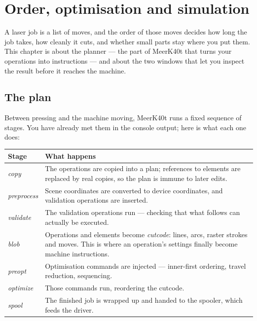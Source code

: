 \chapter{Order, optimisation and simulation}
\label{ch:order}

A laser job is a list of moves, and the order of those moves decides how long the
job takes, how cleanly it cuts, and whether small parts stay where you put them.
This chapter is about the planner --- the part of MeerK40t that turns your
operations into instructions --- and about the two windows that let you inspect
the result before it reaches the machine.

\section{The plan}

Between pressing  and the machine moving, MeerK40t runs a fixed
sequence of stages. You have already met them in the console output; here is what
each one does:

\begin{center}\small
\begin{tabular}{@{}L{2.3cm}L{11.9cm}@{}}
\toprule
\textbf{Stage} & \textbf{What happens} \\
\midrule
\emph{copy} & The operations are copied into a plan; references to elements are
replaced by real copies, so the plan is immune to later edits. \\
\emph{preprocess} & Scene coordinates are converted to device coordinates, and
validation operations are inserted. \\
\emph{validate} & The validation operations run --- checking that what follows can
actually be executed. \\
\emph{blob} & Operations and elements become \emph{cutcode}: lines, arcs, raster
strokes and moves. This is where an operation's settings finally become machine
instructions. \\
\emph{preopt} & Optimisation commands are injected --- inner-first ordering,
travel reduction, sequencing. \\
\emph{optimize} & Those commands run, reordering the cutcode. \\
\emph{spool} & The finished job is wrapped up and handed to the spooler, which
feeds the driver. \\
\bottomrule
\end{tabular}
\end{center}

